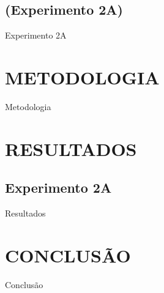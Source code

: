 \documentclass[a4paper,12pt]{article}
\begin{document}
\subsection{(Experimento 2A)}

\begin{justify}
    Experimento 2A
\end{justify}

\newpage


\thispagestyle{main}

\section{METODOLOGIA}

\begin{justify}
    Metodologia
\end{justify}

\newpage


\thispagestyle{main}

\section{RESULTADOS}

\subsection{Experimento 2A}

\begin{justify}
    Resultados
\end{justify}

\newpage


\thispagestyle{main}

\section{CONCLUSÃO}

\begin{justify}
    Conclusão
\end{justify}

\newpage


{}
{}

\nocite{*}



\newpage
\appendix


\end{document}
